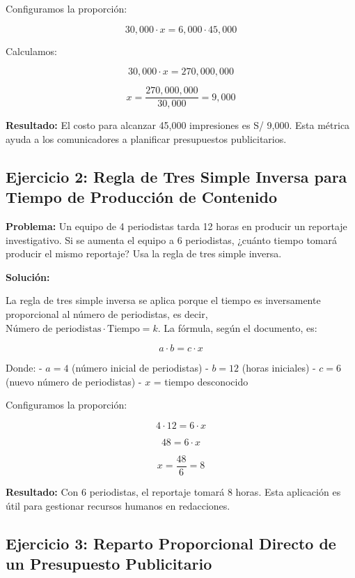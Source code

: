 \documentclass[
  stu,
  floatsintext,
  longtable,
  a4paper,
  nolmodern,
  notxfonts,
  notimes,
  colorlinks=true,linkcolor=blue,citecolor=blue,urlcolor=blue]{apa7}
\begin{document}
Configuramos la proporción:

\[
30,000 \cdot x = 6,000 \cdot 45,000
\]

Calculamos:

\[
30,000 \cdot x = 270,000,000
\]

\[
x = \frac{270,000,000}{30,000} = 9,000
\]

\textbf{Resultado:} El costo para alcanzar 45,000 impresiones es S/
9,000. Esta métrica ayuda a los comunicadores a planificar presupuestos
publicitarios.

\subsection{Ejercicio 2: Regla de Tres Simple Inversa para Tiempo de
Producción de
Contenido}\label{ejercicio-2-regla-de-tres-simple-inversa-para-tiempo-de-producciuxf3n-de-contenido}

\textbf{Problema:} Un equipo de 4 periodistas tarda 12 horas en producir
un reportaje investigativo. Si se aumenta el equipo a 6 periodistas,
¿cuánto tiempo tomará producir el mismo reportaje? Usa la regla de tres
simple inversa.

\textbf{Solución:}

La regla de tres simple inversa se aplica porque el tiempo es
inversamente proporcional al número de periodistas, es decir,
\(\text{Número de periodistas} \cdot \text{Tiempo} = k\). La fórmula,
según el documento, es:

\[
a \cdot b = c \cdot x
\]

Donde: - \(a = 4\) (número inicial de periodistas) - \(b = 12\) (horas
iniciales) - \(c = 6\) (nuevo número de periodistas) - \(x\) = tiempo
desconocido

Configuramos la proporción:

\[
4 \cdot 12 = 6 \cdot x
\]

\[
48 = 6 \cdot x
\]

\[
x = \frac{48}{6} = 8
\]

\textbf{Resultado:} Con 6 periodistas, el reportaje tomará 8 horas. Esta
aplicación es útil para gestionar recursos humanos en redacciones.

\subsection{Ejercicio 3: Reparto Proporcional Directo de un Presupuesto
Publicitario}\label{ejercicio-3-reparto-proporcional-directo-de-un-presupuesto-publicitario}
\end{document}
